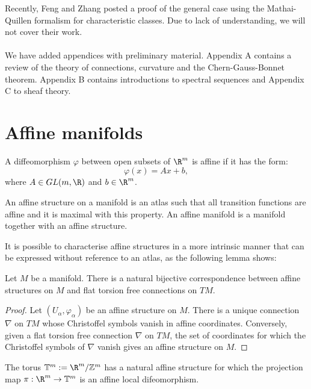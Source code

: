 Recently, Feng and Zhang \cite{FZ} posted a proof of the general case using the Mathai-Quillen formalism for characteristic classes. Due to lack of understanding, we will not cover their work.\\ \\
We have added appendices with preliminary material.
Appendix A contains a review of the theory of connections, curvature and the Chern-Gauss-Bonnet theorem.
Appendix B contains introductions to spectral sequences and Appendix C to sheaf theory.
\section{Affine manifolds}


\begin{definition}
	A diffeomorphism $\varphi$ between open subsets of $\R^m$ is affine if it has the form:
	\[ \varphi(x)= Ax+b,\]
	where $A \in {GL}(m,\R)$ and $b \in \R^m$.
\end{definition}

\begin{definition}
	An  affine structure on a manifold is an atlas such that all transition functions are affine and it is maximal with this property.
	An affine manifold is a manifold together with an affine structure.
\end{definition}

It is possible to characterise affine structures in a more intrinsic manner that can be expressed without reference to an atlas, as the following lemma shows:

\begin{lemma}
	Let $M$ be a manifold. There is a natural bijective correspondence between affine structures on $M$ and flat torsion free connections on $TM$.
\end{lemma}
\begin{proof}
	Let $(U_\alpha,\varphi_\alpha)$ be an affine structure on $M$. There is a unique connection $\nabla$ on $TM$ whose Christoffel symbols vanish in affine coordinates. Conversely, given a flat torsion free connection $\nabla$ on $TM$, the set of coordinates for which the Christoffel symbols of $\nabla$ vanish gives an affine structure on $M$.
\end{proof}

\begin{example}
	The torus $\mathbb{T}^m:= \R^m/\mathbb{Z}^m$ has a natural affine structure for which the projection map $\pi: \R^m \rightarrow \mathbb{T}^m$ is an affine local difeomorphism.
\end{example}


